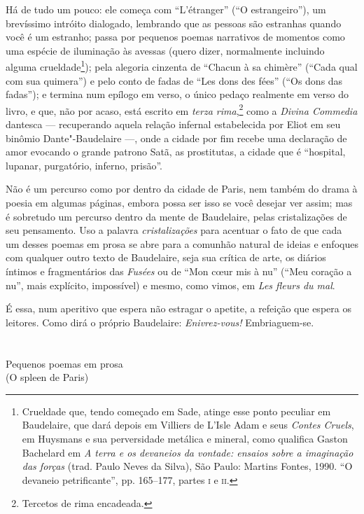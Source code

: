 Há de tudo um pouco: ele começa com “L’étranger” (“O estrangeiro”), um
brevíssimo intróito dialogado, lembrando que as pessoas são estranhas
quando você é um estranho; passa por pequenos poemas narrativos de
momentos como uma espécie de iluminação às avessas (quero dizer,
normalmente incluindo alguma crueldade\footnote{ Crueldade que, tendo
começado em Sade, atinge esse ponto peculiar em Baudelaire, que dará
depois em Villiers de L’Isle Adam e seus \textit{Contes Cruels}, em Huysmans e
sua perversidade metálica e mineral, como qualifica Gaston Bachelard em
\textit{A terra e os devaneios da vontade: ensaios sobre a imaginação das
forças} (trad. Paulo Neves da Silva), São Paulo: Martins Fontes,
1990. “O devaneio petrificante”, pp. 165--177, partes \textsc{i} e \textsc{ii}.}); pela
alegoria cinzenta de “Chacun à sa chimère” (“Cada qual com sua quimera”)
e pelo conto de fadas de “Les dons des fées” (“Os dons das fadas”); e
termina num epílogo em verso, o único pedaço realmente em verso do
livro, e que, não por acaso, está escrito em \textit{terza
rima},\footnote{ Tercetos de rima encadeada.} como a \textit{Divina
Commedia} dantesca --- recuperando aquela relação infernal estabelecida
por Eliot em seu binômio Dante"-Baudelaire ---, onde a cidade por fim
recebe uma declaração de amor evocando o grande patrono Satã, as
prostitutas, a cidade que é “hospital, lupanar, purgatório, inferno,
prisão”.

Não é um percurso como por dentro da cidade de Paris, nem também do
drama à poesia em algumas páginas, embora possa ser isso se você
desejar ver assim; mas é sobretudo um percurso dentro da mente de
Baudelaire, pelas cristalizações de seu pensamento. Uso a palavra
\textit{cristalizações} para acentuar o fato de que cada um desses
poemas em prosa se abre para a comunhão natural de ideias e enfoques
com qualquer outro texto de Baudelaire, seja sua crítica de arte, os
diários íntimos e fragmentários das \textit{Fusées} ou de “Mon
c\oe ur mis à nu” (“Meu coração a nu”, mais explícito, impossível) e
mesmo, como vimos, em \textit{Les fleurs du mal}. 

É essa, num aperitivo que espera não estragar o apetite, a refeição que espera os leitores. Como dirá o próprio Baudelaire: \textit{Enivrez-vous!} Embriaguem-se.


\chapter*{}
\begin{center}
\begin{vplace}[0.3]
\Large
Pequenos poemas em prosa\\
(O spleen de Paris)
\end{vplace}
\end{center}
\thispagestyle{empty}